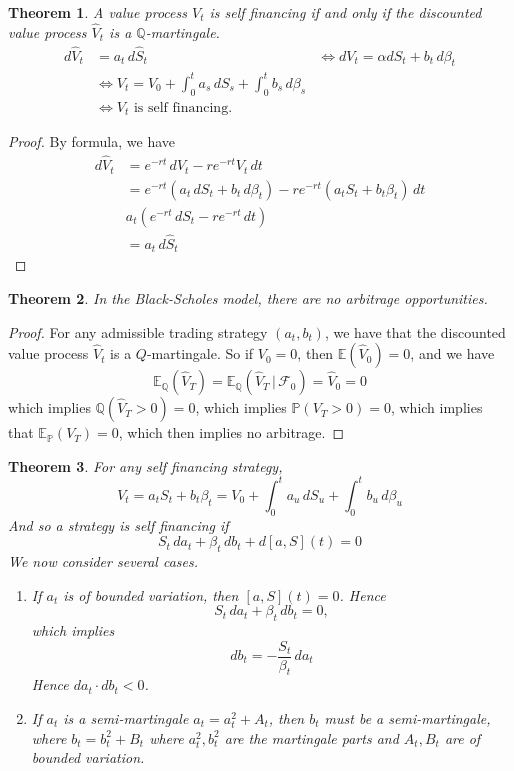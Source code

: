 \documentclass[10pt, oneside, reqno]{amsart}
\theoremstyle{plain}%
\newtheorem{thm}{Theorem}[section]
\theoremstyle{definition}
\theoremstyle{remark}
\newcommand{\given}{ \, | \,}
\newcommand{\Q}{\mathbb{Q}}
\renewcommand{\P}{\mathbb{P}}
\newcommand{\E}{\mathbb{E}}
\newcommand{\sigf}{\mathcal{F}}
\begin{document}
\begin{thm}
    A value process $V_t$ is self financing if and only if the discounted value process $\hat V_t$ is a $\Q$-martingale.
\begin{align*}
        d \hat V_t &= a_t \, d\hat S_t &\iff dV_t = \alpha dS_t + b_t \, d\beta_t \\
                        &\iff V_t = V_0 + \int_0^t a_s \, dS_s + \int_0^t b_s \, d\beta_s \\
                        &\iff \text{$V_t$ is self financing.  }
\end{align*}
\end{thm}

\begin{proof}
    By \itos formula, we have \begin{align*}
        d \hat V_t  &= e^{-rt} \, d V_t - re^{-rt} V_t \, dt \\
                    &= e^{-rt} \left( a_t \, dS_t + b_t \, d\beta_t \right) - re^{-rt} \left( a_t S_t + b_t \beta_t \right) \, dt \\
                    & a_t (e^{-rt} \, dS_t - re^{-rt} \, dt) \\
                    &= a_t \, d \hat S_t
    \end{align*} 
\end{proof}

\begin{thm}
    In the Black-Scholes model, there are no arbitrage opportunities.
\end{thm}

\begin{proof}
    For any admissible trading strategy $(a_t, b_t)$, we have that the discounted value process $\hat V_t$ is a $Q$-martingale.  So if $V_0 = 0$, then $\E(\hat V_0) = 0$, and we have \[
        \E_\Q(\hat V_T) = \E_\Q(\hat V_T \given \sigf_0) = \hat V_0 = 0
    \] which implies $\Q(\hat V_T > 0) = 0$, which implies $\P(V_T > 0) = 0$, which implies that $\E_\P(V_T) = 0$, which then implies no arbitrage.     
\end{proof}

\begin{thm}
    For any self financing strategy, \[
        V_t = a_t S_t + b_t \beta_t = V_0 + \int_0^t a_u \, dS_u + \int_0^t b_u \, d\beta_u
    \]  And so a strategy is self financing if \[
        S_t \, da_t + \beta_t \, db_t + d[a, S](t) = 0
    \]  We now consider several cases.
    \begin{enumerate}
        \item   If $a_t$ is of bounded variation, then $[a, S](t) = 0$.  Hence \[
            S_t \, da_t + \beta_t \, db_t = 0,
        \] which implies \[
            db_t = -\frac{S_t}{\beta_t} \, da_t
        \]  Hence $da_t \cdot db_t < 0$.  
        \item If $a_t$ is a semi-martingale $a_t = a_t^2 + A_t$, then $b_t$ must be a semi-martingale, where $b_t = b_t^2 + B_t$ where $a_t^2, b_t^2$ are the martingale parts and $A_t, B_t$ are of bounded variation.
    \end{enumerate}
\end{thm}
\end{document}
